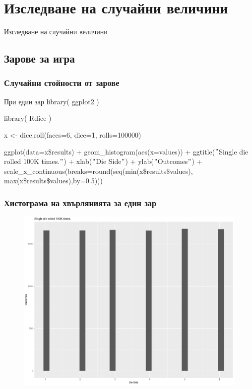 \documentclass{beamer}
\begin{document}
\section{Изследване на случайни величини}

\begin{frame}
\center \huge{Изследване на случайни величини}
\end{frame}

\subsection{Зарове за игра}

\begin{frame}
\frametitle{Случайни стойности от зарове}
\begin{block}{При един зар}
library( ggplot2 )

library( Rdice )

x <- dice.roll(faces=6, dice=1, rolls=100000)

ggplot(data=x\$results) + geom\_histogram(aes(x=values)) + ggtitle($"$Single die rolled 100K times.$"$) + xlab($"$Die Side$"$) + ylab($"$Outcomes$"$) + scale\_x\_continuous(breaks=round(seq(min(x\$results\$values), max(x\$results\$values),by=0.5)))
\end{block}
\end{frame}

\begin{frame}
\frametitle{Хистограма на хвърлянията за един зар}
\begin{figure}[]\includegraphics[width=\textwidth,height=0.75\textheight]{pic0047}\end{figure}
\end{frame}
\end{document}
